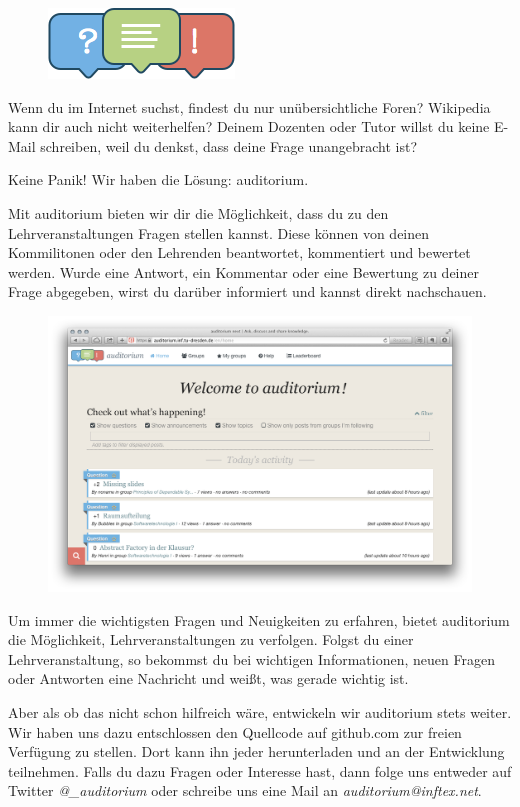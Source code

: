 
\begin{figure}
\includegraphics[width=.95\linewidth]{img/auditorium_logo}
\end{figure}

Wenn du im Internet suchst, findest du nur unübersichtliche Foren?
Wikipedia kann dir auch nicht weiterhelfen?
Deinem Dozenten oder Tutor willst du keine E-Mail schreiben, weil du denkst, dass deine Frage unangebracht ist?

Keine Panik!
Wir haben die Lösung: auditorium.

Mit auditorium bieten wir dir die Möglichkeit, dass du zu den Lehrveranstaltungen Fragen stellen kannst.
Diese können von deinen Kommilitonen oder den Lehrenden beantwortet, kommentiert und bewertet werden.
Wurde eine Antwort, ein Kommentar oder eine Bewertung zu deiner Frage abgegeben, wirst du darüber informiert und kannst direkt nachschauen.

\begin{figure}
\includegraphics[width=\linewidth]{img/auditorium.png}
\end{figure}

Um immer die wichtigsten Fragen und Neuigkeiten zu erfahren, bietet auditorium die Möglichkeit, Lehrveranstaltungen zu verfolgen.
Folgst du einer Lehrveranstaltung, so bekommst du bei wichtigen Informationen, neuen Fragen oder Antworten eine Nachricht und weißt, was gerade wichtig ist.

Aber als ob das nicht schon hilfreich wäre, entwickeln wir auditorium stets weiter.
Wir haben uns dazu entschlossen den Quellcode auf github.com zur freien Verfügung zu stellen.
Dort kann ihn jeder herunterladen und an der Entwicklung teilnehmen.
Falls du dazu Fragen oder Interesse hast, dann folge uns entweder auf Twitter \textit{@\_auditorium} oder schreibe uns eine Mail an \textit{auditorium@inftex.net}.
